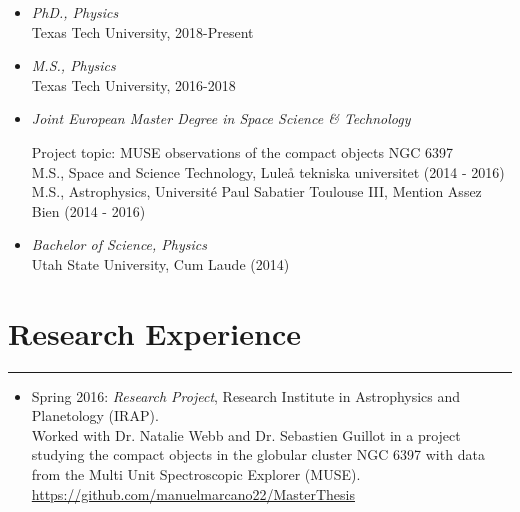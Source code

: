 \documentclass[letterpaper,10pt]{article}
\begin{document}
\begin{itemize}[label=$\blacktriangleright$]

  \item \emph{PhD., Physics}  \\
   Texas Tech University, 2018-Present

  \item \emph{M.S., Physics}  \\
   Texas Tech University, 2016-2018



  \item \emph{Joint European Master Degree in Space Science \& Technology} 
  \begin{itemize}[label=]
     Project topic: MUSE observations of the compact objects NGC 6397 \\
     M.S., Space and Science Technology, Lule\r a tekniska universitet  (2014 - 2016) \\
     M.S., Astrophysics, Universit\'e Paul Sabatier Toulouse III, Mention Assez Bien (2014 - 2016) 
  \end{itemize}




  \item \emph{Bachelor of Science, Physics}  \\
   Utah State University, Cum Laude (2014)

\end{itemize}


\section*{Research Experience}

\hrule
\vspace{.3 cm}



\begin{itemize}[label=$\blacktriangleright$]
        \item Spring 2016: \emph{Research Project}, Research Institute in Astrophysics and Planetology (IRAP).\\
                Worked with Dr. Natalie Webb and Dr. Sebastien Guillot in a project studying the compact objects in the globular cluster NGC 6397 with data from the Multi Unit Spectroscopic Explorer (MUSE). \url{https://github.com/manuelmarcano22/MasterThesis} 
                
\end{itemize}
                
\end{document}
